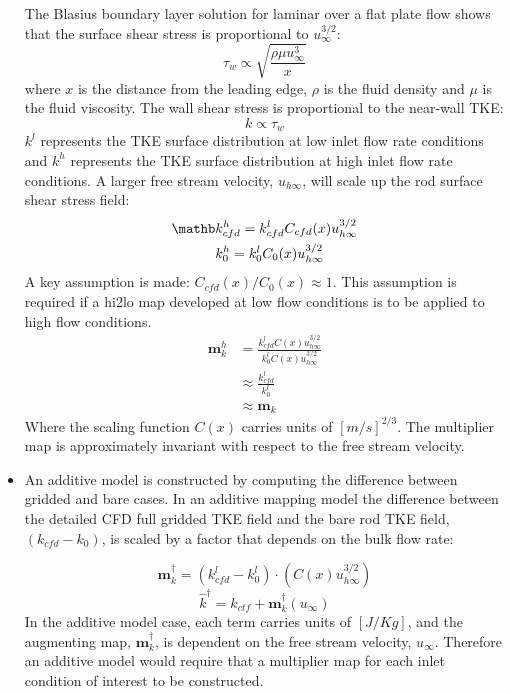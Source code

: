 \begin{itemize}
    The Blasius boundary layer solution for laminar over a flat plate flow shows that the surface shear stress is proportional to $u_\infty^{3/2}$:
\begin{equation}
        \tau_w \propto \sqrt{\frac{\rho \mu u_\infty^3}{x}}
\end{equation}
where $x$ is the distance from the leading edge, $\rho$ is the fluid density and $\mu$ is the fluid viscosity.
        The wall shear stress is proportional to the near-wall TKE:
        \begin{equation}
        k \propto \tau_w
        \end{equation}
    $k^{l}$ represents the TKE surface distribution at low inlet flow rate conditions and
    $k^{h}$ represents the TKE surface distribution at high inlet flow rate conditions.
    A larger free stream velocity, $u_{h\infty}$, will scale up the rod surface shear stress field:
     \begin{eqnarray}
         \mathb
         & k^h_{cfd} = k^{l}_{cfd}C_{cfd}(x) u_{h\infty}^{3/2} \nonumber \\
         & k^h_0 = k^l_0 C_0(x) u_{h\infty}^{3/2}
     \end{eqnarray}
     A key assumption is made: $C_{cfd}(x) / C_0(x) \approx 1$.  This assumption is required if a hi2lo map developed at low flow conditions is to be applied to high flow conditions.
    \begin{align*}
        \mathbf m_k^h & = \frac{k^{l}_{cfd}C(x) u_{h\infty}^{3/2}}{k^l_0 C(x) u_{h\infty}^{3/2}}  \nonumber \\
                      & \approx \frac{k^l_{cfd}}{k^l_0} \\
                      & \approx \mathbf m_k
     \end{align*}
     Where the scaling function $C(x)$ carries units of $[m/s]^{2/3}$.
     The multiplier map is approximately invariant with respect to the free stream velocity.

     \item An additive model is constructed by computing the difference between gridded and bare cases.
     In an additive mapping model the difference between the detailed CFD full gridded TKE field and the bare rod TKE field, $(k_{cfd} - k_0)$, is scaled by a factor that depends on the bulk flow rate:

     \begin{equation}
     \mathbf m_k^\dagger = (k^l_{cfd} - k^l_0)\cdot(C(x) u_{h\infty}^{3/2})
     \end{equation}
     \begin{equation}
     \hat k^\dagger = k_{ctf} + \mathbf m_k^\dagger(u_\infty)
     \end{equation}
     In the additive model case, each term carries units of $[J/Kg]$, and the augmenting map, $\mathbf m_k^\dagger$, is dependent on the free stream velocity, $u_\infty$.  Therefore an additive model would require that a multiplier map for each inlet condition of interest to be constructed.


\end{itemize}
